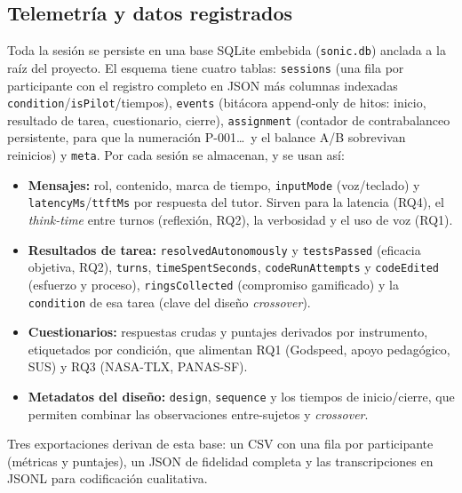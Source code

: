 \documentclass[conference]{IEEEtran}
\begin{document}
\subsection{Telemetr\'ia y datos registrados}
\label{sec:telemetry}
Toda la sesi\'on se persiste en una base SQLite embebida (\texttt{sonic.db}) anclada a la ra\'iz del
proyecto. El esquema tiene cuatro tablas: \texttt{sessions} (una fila por participante con el
registro completo en JSON m\'as columnas indexadas \texttt{condition}/\texttt{isPilot}/tiempos),
\texttt{events} (bit\'acora append-only de hitos: inicio, resultado de tarea, cuestionario, cierre),
\texttt{assignment} (contador de contrabalanceo persistente, para que la numeraci\'on
P-001\dots\ y el balance A/B sobrevivan reinicios) y \texttt{meta}. Por cada sesi\'on se
almacenan, y se usan as\'i:
\begin{itemize}
  \item \textbf{Mensajes:} rol, contenido, marca de tiempo, \texttt{inputMode} (voz/teclado) y
        \texttt{latencyMs}/\texttt{ttftMs} por respuesta del tutor. Sirven para la latencia (RQ4),
        el \emph{think-time} entre turnos (reflexi\'on, RQ2), la verbosidad y el uso de voz (RQ1).
  \item \textbf{Resultados de tarea:} \texttt{resolvedAutonomously} y \texttt{testsPassed} (eficacia
        objetiva, RQ2), \texttt{turns}, \texttt{timeSpentSeconds}, \texttt{codeRunAttempts} y
        \texttt{codeEdited} (esfuerzo y proceso), \texttt{ringsCollected} (compromiso gamificado) y
        la \texttt{condition} de esa tarea (clave del dise\~no \emph{crossover}).
  \item \textbf{Cuestionarios:} respuestas crudas y puntajes derivados por instrumento, etiquetados
        por condici\'on, que alimentan RQ1 (Godspeed, apoyo pedag\'ogico, SUS) y RQ3 (NASA-TLX,
        PANAS-SF).
  \item \textbf{Metadatos del dise\~no:} \texttt{design}, \texttt{sequence} y los tiempos de
        inicio/cierre, que permiten combinar las observaciones entre-sujetos y \emph{crossover}.
\end{itemize}
Tres exportaciones derivan de esta base: un CSV con una fila por participante (m\'etricas y
puntajes), un JSON de fidelidad completa y las transcripciones en JSONL para codificaci\'on
cualitativa.
\end{document}
